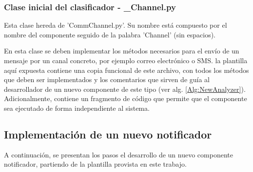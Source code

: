         \subsubsection{Clase inicial del clasificador - \_Channel.py}
        \label{sub2:classFileChannel}
            Esta clase hereda de 'CommChannel.py'. Su nombre está compuesto por el nombre del componente seguido de la palabra 'Channel' (sin espacios).
            
            En esta clase se deben implementar los métodos necesarios para el envío de un mensaje por un canal concreto, por ejemplo correo electrónico o SMS. la plantilla aquí expuesta contiene una copia funcional de este archivo, con todos los métodos que deben ser implementados y los comentarios que sirven de guía al desarrollador de un nuevo componente de este tipo (ver alg. \ref{Alg:NewAnalyzer}). Adicionalmente, contiene un fragmento de código que permite que el componente sea ejecutado de forma independiente al sistema.
            
            
            
    \subsection{Implementación de un nuevo notificador}
    \label{sub:DevelopingChannel}
        
        A continuación, se presentan los pasos el desarrollo de un nuevo componente notificador, partiendo de la plantilla provista en este trabajo.
    

